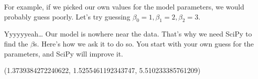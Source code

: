 \documentclass[letterpaper,10pt,english]{sphinxmanual}
\begin{document}
For example, if we picked our own values for the model parameters, we would probably guess poorly.  Let’s try guessing \(\beta_0=1,\beta_1=2,\beta_2=3\).

\begin{sphinxVerbatim}[commandchars=\\\{\}]
         

   
      

   
     
\end{sphinxVerbatim}

\noindent{}

Yyyyyyeah…  Our model is nowhere near the data.  That’s why we need SciPy to find the \(\beta\)s.  Here’s how we ask it to do so.  You start with your own guess for the parameters, and SciPy will improve it.

\begin{sphinxVerbatim}[commandchars=\\\{\}]
   
  \PYG{p}{[}    \PYG{p}{]}
        
    
  
\end{sphinxVerbatim}

\begin{sphinxVerbatim}[commandchars=\\\{\}]
(1.3739384272240622, \PYGZhy{}1.5255461192343747, 5.510233385761209)
\end{sphinxVerbatim}
\end{document}
